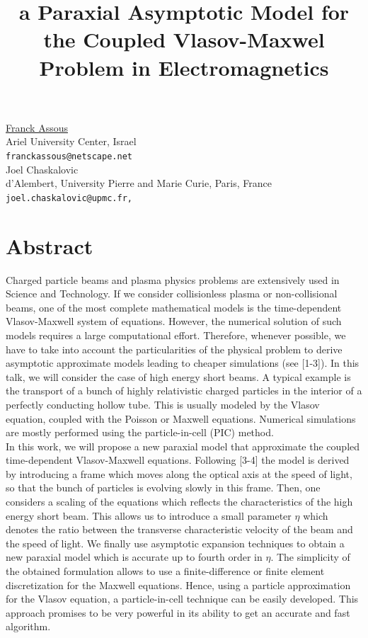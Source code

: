 \documentclass[article,A4,11pt]{llncs}%
\begin{document}
\title{a Paraxial Asymptotic Model for the Coupled Vlasov-Maxwel Problem in Electromagnetics}
 \author{} \institute{}
\maketitle
\begin{center}
{\large \underline{Franck Assous}}\\
Ariel University Center, Israel\\
{\tt franckassous@netscape.net}
\\ \vspace{4mm}
{\large Joel Chaskalovic}\\
d'Alembert,  University Pierre and Marie Curie, Paris, France\\
{\tt joel.chaskalovic@upmc.fr,}
\end{center}

\section*{Abstract}
Charged particle beams and plasma physics problems are extensively used in Science and Technology. If we consider collisionless plasma or non-collisional beams, one of the most complete mathematical models is the time-dependent
Vlasov-Maxwell system of equations. 
However, the numerical solution of such models requires a large computational effort. Therefore, whenever possible, we have to take into account the
particularities of the physical problem to derive asymptotic approximate models
leading to cheaper simulations (see [1-3]). In this talk, we will consider the case of high energy short beams. A typical example is the transport of a bunch of highly relativistic
charged particles in the interior of a perfectly conducting hollow tube. This is usually modeled by the Vlasov equation, coupled with the Poisson or Maxwell equations. Numerical simulations are mostly performed using the particle-in-cell (PIC) method.\\


In this work, we will propose a new paraxial model that approximate the coupled  time-dependent Vlasov-Maxwell equations. Following [3-4] the model is derived by introducing a frame  which moves along the optical axis at the speed of light, so that the bunch of particles  is evolving slowly in this frame. Then, one considers a scaling of the equations which reflects the characteristics of the high energy short beam. This allows us to introduce a small parameter $\eta$ which denotes the ratio between the transverse characteristic velocity of the beam and the speed  of light. We finally use asymptotic expansion techniques to obtain a new paraxial model which is accurate up to fourth order in $\eta$. The simplicity of the obtained formulation allows to use a finite-difference or finite element discretization for the Maxwell equations. Hence, using a particle approximation for the Vlasov equation, a particle-in-cell technique can be easily developed. This approach promises to be very powerful in its ability to get an accurate and fast algorithm.
\end{document}
